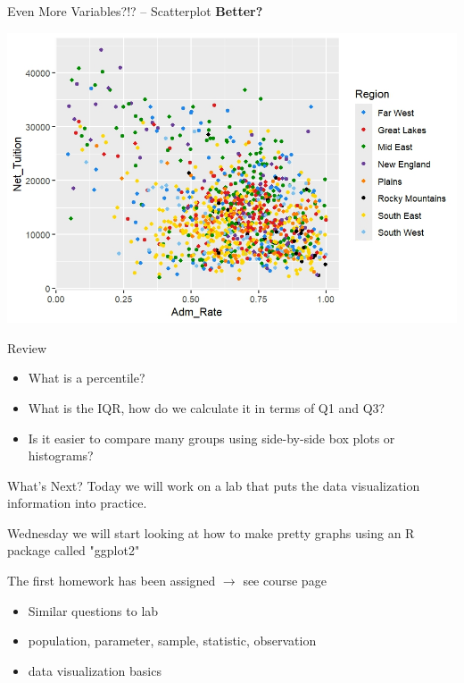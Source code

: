 \documentclass{beamer}
\begin{document}
\begin{frame}{Even More Variables?!? -- Scatterplot}
\textbf{Better?}
\begin{center}
\includegraphics[scale=.7]{img/scatter_by_region2.jpeg}
\end{center}
\end{frame}

\begin{frame}{Review}
\begin{itemize}
\item What is a percentile? \vspace{3mm}
\item What is the IQR, how do we calculate it in terms of Q1 and Q3? \vspace{3mm}
\item Is it easier to compare many groups using side-by-side box plots or histograms?
\end{itemize}
\end{frame}

\begin{frame}{What's Next?}
Today we will work on a lab that puts the data visualization information into practice. \vspace{10mm}

Wednesday we will start looking at how to make pretty graphs using an R package called "ggplot2" \vspace{10mm}

The first homework has been assigned $\rightarrow$ see course page
\begin{itemize}
    \item Similar questions to lab
    \item population, parameter, sample, statistic, observation
    \item data visualization basics
\end{itemize}

\end{frame}
\end{document}
